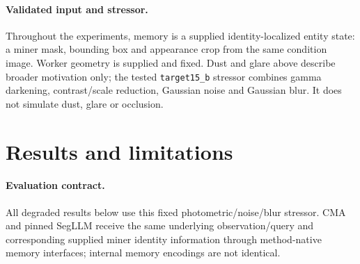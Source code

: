 \documentclass[10pt,twocolumn]{article}
\begin{document}



\paragraph{Validated input and stressor.}
Throughout the experiments, memory is a supplied identity-localized entity
state: a miner mask, bounding box and appearance crop from the same condition
image. Worker geometry is supplied and fixed. Dust and glare above describe
broader motivation only; the tested \texttt{target15\_b} stressor combines
gamma darkening, contrast/scale reduction, Gaussian noise and Gaussian blur.
It does not simulate dust, glare or occlusion.

\section{Results and limitations}
\paragraph{Evaluation contract.}
All degraded results below use this fixed photometric/noise/blur stressor.
CMA and pinned SegLLM receive the same underlying observation/query and
corresponding supplied miner identity information through method-native
memory interfaces; internal memory encodings are not identical.



\clearpage

\end{document}
